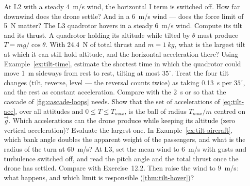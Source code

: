 \begin{exercises}
\exercise[1] At L2 with a steady \SI{4}{m/s} wind, the horizontal I term is switched off. How far downwind does the drone settle? And in a \SI{6}{m/s} wind — does the force limit of \SI{5}{N} matter?
\exercise[1] The L3 quadrotor hovers in a steady \SI{6}{m/s} wind. Compute its tilt and its thrust.
\exercise[1] A quadrotor holding its altitude while tilted by $\theta$ must produce $T = mg/\cos\theta$. With \SI{24.4}{N} of total thrust and $m = \SI{1}{kg}$, what is the largest tilt at which it can still hold altitude, and the horizontal acceleration there?
\exercise[2] Using Example~\ref{ex:tilt-time}, estimate the shortest time in which the quadrotor could move \SI{1}{m} sideways from rest to rest, tilting at most $35^\circ$. Treat the four tilt changes (tilt, reverse, level — the reversal counts twice) as taking \SI{0.13}{s} per $35^\circ$, and the rest as constant acceleration. Compare with the \SI{2}{s} or so that the cascade of \cref{fig:cascade-loops} needs.
\exercise[2] Show that the set of accelerations of \cref{eq:tilt-acc}, over all attitudes and $0 \le T \le T_{max}$, is the ball of radius $T_{max}/m$ centred on $\vec g$. Which accelerations can the drone produce while keeping its altitude (zero vertical acceleration)? Evaluate the largest one.
\exercise[2] In Example~\ref{ex:tilt-aircraft}, which bank angle doubles the apparent weight of the passengers, and what is the radius of the turn at \SI{60}{m/s}?
\exercise[2] At L3, set the mean wind to \SI{6}{m/s} with gusts and turbulence switched off, and read the pitch angle and the total thrust once the drone has settled. Compare with Exercise~12.2. Then raise the wind to \SI{9}{m/s}: what happens, and which limit is responsible (\cref{thm:tilt-hover})?

\end{exercises}
